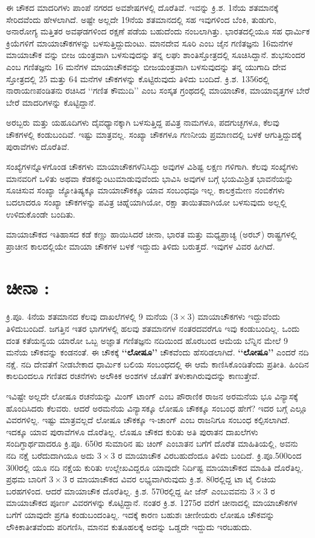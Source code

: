 ಈ ಚೌಕದ ಮಾದರಿಗಳು ಪಾಂಪೆ ನಗರದ ಅವಶೇಷಗಳಲ್ಲಿ ದೊರೆತಿವೆ. ಇವನ್ನು ಕ್ರಿ.ಶ. 1ನೆಯ ಶತಮಾನಕ್ಕೆ ಸೇರಿದವೆಂದು ಹೇಳಲಾಗಿದೆ. ಅಷ್ಟೇ ಅಲ್ಲದೇ 19ನೆಯ ಶತಮಾನದಲ್ಲಿ ಸಹ ಇವುಗಳಿಂದ ಬೆಂಕಿ, ತುಡುಗು, ಅನಾರೋಗ್ಯ ಮತ್ತಿತರ ಅವಘಡಗಳಿಂದ ರಕ್ಷಣೆ ಪಡೆಯ ಬಹುದೆಂದು ನಂಬಲಾಗಿತ್ತು. ಭಾರತದಲ್ಲಿಯೂ ಸಹ ಧಾರ್ಮಿಕ ಕ್ರಿಯೆಗಳಿಗೆ ಮಾಯಾಚೌಕಗಳನ್ನು ಬಳಸುತ್ತಿದ್ದುದುಂಟು. ಮಾನದೇವ ಸೂರಿ ಎಂಬ ಜೈನ ಗಣಿತಜ್ಞನು 16ಮನೆಗಳ ಮಾಯಾಚೌಕ ವನ್ನು ಬೀಜ ಯಂತ್ರವಾಗಿ ಬಳಸುವುದನ್ನು ತನ್ನ ಲಘು ಶಾಂತಿಸ್ತೋತ್ರದಲ್ಲಿ ಸೂಚಿಸಿದ್ದಾನೆ. ಶುಭಸುಂದರ ಎಂಬ ಗಣಿತಜ್ಞನು 16 ಮನೆಗಳ ಮಾಯಾಚೌಕವನ್ನು ಬೀಜಯಂತ್ರವಾಗಿ ಬಳಸುವುದನ್ನು ತನ್ನ ಯುಗಾದಿ ದೇವ ಸ್ತೋತ್ರದಲ್ಲಿ 25 ಮತ್ತು 64 ಮನೆಗಳ ಚೌಕಗಳನ್ನು ಕೊಟ್ಟಿರುವುದು ತಿಳಿದು ಬಂದಿದೆ. ಕ್ರಿ.ಶ. 1356ರಲ್ಲಿ ನಾರಾಯಣಪಂಡಿತನು ರಚಿಸಿದ ‘‘ಗಣಿತ ಕೌಮುದಿ’’ ಎಂಬ ಸಂಸ್ಕತ ಗ್ರಂಥದಲ್ಲಿ ಮಾಯಾಚೌಕ, ಮಾಯಾವೃತ್ತಗಳ ಬೇರೆ ಬೇರೆ ಮಾದರಿಗಳನ್ನು ಕೊಟ್ಟಿದ್ದಾನೆ.

ಅರಬ್ಬರು ಮತ್ತು ಯಹೂದಿಗಳು ದೈವಧ್ಯಾನಕ್ಕಾಗಿ ಬಳಸುತ್ತಿದ್ದ ಪವಿತ್ರ ನಾಮಗಳೂ, ಪದಗುಚ್ಛಗಳೂ, ಕೆಲವು ಚೌಕಗಳಲ್ಲಿ ಕಂಡುಬಂದಿವೆ. ಇಷ್ಟು ಮಾತ್ರವಲ್ಲ. ಸಂಖ್ಯಾ ಚೌಕಗಳೂ ಗಣನೀಯ ಪ್ರಮಾಣದಲ್ಲಿ ಬಳಕೆ ಆಗುತ್ತಿದ್ದುದಕ್ಕೆ ಪುರಾವೆಗಳು ದೊರೆತಿವೆ.

ಸಂಖ್ಯೆಗಳನ್ನೊಳಗೊಂಡ ಚೌಕಗಳು ಮಾಯಾಚೌಕಗಳೆನಿಸಿದ್ದು ಅವುಗಳ ವಿಶಿಷ್ಟ ಲಕ್ಷಣ ಗಳಿಗಾಗಿ. ಕೆಲವು ಸಂಖ್ಯೆಗಳು ಮಾನವರಿಗೆ ಒಳಿತು ಅಥವಾ ಕೆಡಕನ್ನುಂಟುಮಾಡುವುವೆಂದು ಭಾವಿಸಿ ಅವುಗಳ ಬಗ್ಗೆ ಭಯಮಿಶ್ರಿತ ಭಾವನೆಯನ್ನು ಸೂಚಿಸುವ ಸಂಖ್ಯಾ ಜ್ಯೋತಿಷ್ಯಕ್ಕೂ ಮಾಯಾಚೌಕಕ್ಕೂ ಯಾವ ಸಂಬಂಧವೂ ಇಲ್ಲ. ಕಾಲಕ್ರಮೇಣ ನಂಬಿಕೆಗಳು ಬದಲಾದರೂ ಸಂಖ್ಯಾ ಚೌಕಗಳನ್ನು ಪವಿತ್ರ ಚಿಹ್ನೆಯಾಗಿಯೋ, ರಕ್ಷಾ ತಾಯಿತವಾಗಿಯೋ ಬಳಸುವುದು ಅಲ್ಲಲ್ಲಿ ಉಳಿದುಕೊಂಡೇ ಬಂದಿತು.

ಮಾಯಾಚೌಕದ ಇತಿಹಾಸದ ಕಡೆ ಕಣ್ಣು ಹಾಯಿಸಿದರೆ ಚೀನಾ, ಭಾರತ ಮತ್ತು ಮಧ್ಯಪ್ರಾಚ್ಯ (ಅರಬ್) ರಾಷ್ಟ್ರಗಳಲ್ಲಿ ಪ್ರಾಚೀನ ಕಾಲದಲ್ಲಿಯೇ ಮಾಯಾ ಚೌಕಗಳ ಬಳಕೆ ಇದ್ದುದು ತಿಳಿದು ಬರುತ್ತದೆ. ಇವುಗಳ ವಿವರ ಹೀಗಿದೆ.

\section*{ಚೀನಾ :}

ಕ್ರಿ.ಪೂ. 4ನೆಯ ಶತಮಾನದ ಕೆಲವು ದಾಖಲೆಗಳಲ್ಲಿ 9 ಮನೆಯ ($3 \times 3$) ಮಾಯಾಚೌಕಗಳು ಇದ್ದುವೆಂದು ತಿಳಿದುಬಂದಿದೆ. ಜಗತ್ತಿನ ಇತರ ಭಾಗಗಳಲ್ಲಿ ಹಲವು ಶತಮಾನಗಳ ನಂತರದವರೆಗೂ ಇವು ಕಂಡುಬಂದಿಲ್ಲ. ಒಂದು ದಂತ ಕತೆಯನ್ವಯ ಯಾರೋ ಒಬ್ಬ ಅಜ್ಞಾತ ಗಣಿತಜ್ಞನು ನದಿಯಿಂದ ಹೊರಬಂದ ಆಮೆಯ ಬೆನ್ನಿನ ಮೇಲೆ 9 ಮನೆಯ ಚೌಕವನ್ನು ಕಂಡನಂತೆ. ಈ ಚೌಕಕ್ಕೆ \textbf{‘‘ಲೋಷೂ’’} ಚೌಕವೆಂದು ಹೆಸರಿಡಲಾಗಿದೆ. \textbf{‘‘ಲೋಷೂ’’} ಎಂದರೆ ನದಿ ನಕ್ಷೆ. ನದಿ ದೇವತೆಗೆ ನೀಡಬೇಕಾದ ಧಾರ್ಮಿಕ ಬಲಿಯ ಸಂಬಂಧದಲ್ಲಿ ಈ ಆಮೆ ಕಾಣಿಸಿಕೊಂಡಿತೆಂದು ಪ್ರತೀತಿ. ಹಿಂದಿನ ಕಾಲದಿಂದಲೂ ಗಣಿತದ ರಚನೆಗಳು ಅಲೌಕಿಕ ಅಂಶಗಳ ಜೊತೆಗೆ ತಳುಕಾಗಿರುವುದನ್ನು ಕಾಣುತ್ತೇವೆ.

ಇವಿಷ್ಟೇ ಅಲ್ಲದೇ ಲೋಷೂ ರಚನೆಯನ್ನು ಮಿಂಗ್ ಟಾಂಗ್ ಎಂಬ ಪೌರಾಣಿಕ ರಾಜನ ಅರಮನೆಯ ಭೂ ವಿನ್ಯಾಸಕ್ಕೆ ಹೊಂದಿಸಿದರು ಕೆಲವರು. ಆದರೆ ಅರಮನೆಯ ವಿನ್ಯಾಸಕ್ಕೂ ಲೋಷೂ ಚೌಕಕ್ಕೂ ಸಂಬಂಧ ಹೇಗೆ? ಇದರ ಬಗ್ಗೆ ಎಲ್ಲೂ ವಿವರಗಳಿಲ್ಲ. ಇಷ್ಟು ಮಾತ್ರವಲ್ಲದೆ ಲೋಷೂ ಚೌಕಕ್ಕೂ ಇ-ಚಾಂಗ್ ಎಂಬ ರಾಜನಿಗೂ ಸಂಬಂಧ ಕಲ್ಪಿಸಲಾಗಿದೆ. ಇದಕ್ಕೂ ಯಾವ ಪುರಾವೆಗಳೂ ದೊರೆತಿಲ್ಲ. ಲೊಷೂ ಚೌಕದ ಕುರಿತು ಅತಿ ಪುರಾತನ ದಾಖಲೆಗಳು ಸಂದಿಗ್ಧಾರ್ಥವಾದರೂ ಕ್ರಿ.ಪೂ. 650ರ ಸುಮಾರಿನ ಷು ಚಿಂಗ್ ಎಂಬಾತನ ಬಗೆಗೆ ದೊರೆತ ಮಾಹಿತಿಯಲ್ಲಿ, ಅವನು ನದಿ ನಕ್ಷೆ ಬರೆದುದಾಗಿಯೂ ಅದು $3 \times 3$ ರ ಮಾಯಾಚೌಕ ವಿರಬಹುದೆಂದೂ ತಿಳಿದು ಬಂದಿದೆ. ಕ್ರಿ.ಪೂ.500ರಿಂದ 300ರಲ್ಲಿ ಯೂ ನದಿ ನಕ್ಷೆಯ ಕುರಿತು ಉಲ್ಲೇಖವಿದ್ದರೂ ಯಾವುದೇ ನಿರ್ದಿಷ್ಟ ಮಾಯಾಚೌಕದ ಮಾಹಿತಿ ದೊರೆತಿಲ್ಲ. ಪ್ರಥಮ ಬಾರಿಗೆ $3 \times 3$ ರ ಮಾಯಾಚೌಕದ ವಿವರ ಲಭ್ಯವಾಗಿರುವುದು ಕ್ರಿ.ಶ. 80ರಲ್ಲಿದ್ದ ಟಾ ಟೈ ಲಿಚಿಯ ಬರಹಗಳಿಂದ. ಆದರೆ ಮಾಯಾಚೌಕ ದೊರೆತಿಲ್ಲ. ಕ್ರಿ.ಶ. 570ರಲ್ಲಿದ್ದ ಷೀ ಜೆನ್ ಎಂಬುವವನು $3 \times 3$ ರ ಮಾಯಾಚೌಕದ ಪೂರ್ಣ ವಿವರಗಳನ್ನು ಕೊಟ್ಟಿದ್ದಾನೆ. ನಂತರ ಕ್ರಿ.ಶ. 1275ರ ವರೆಗೆ ಚೀನಾದಲ್ಲಿ ಮಾಯಾಚೌಕಗಳ ಬಗೆಗೆ ಯಾವುದೇ ಪ್ರಗತಿ ಕಂಡುಬಂದಂತಿಲ್ಲ. ಇದಕ್ಕೆ ಕಾರಣ ಬಹುಶಃ ಚೀಣೀಯರು ಲೋಷೂ ಚೌಕವನ್ನು ಲೌಕಿಕಾತೀತವೆಂದು ಪರಿಗಣಿಸಿ, ಮಾನವ ಕುತೂಹಲಕ್ಕೆ ಅದನ್ನು ಒಡ್ಡದೇ ಇದ್ದುದು ಇರಬಹುದು.

